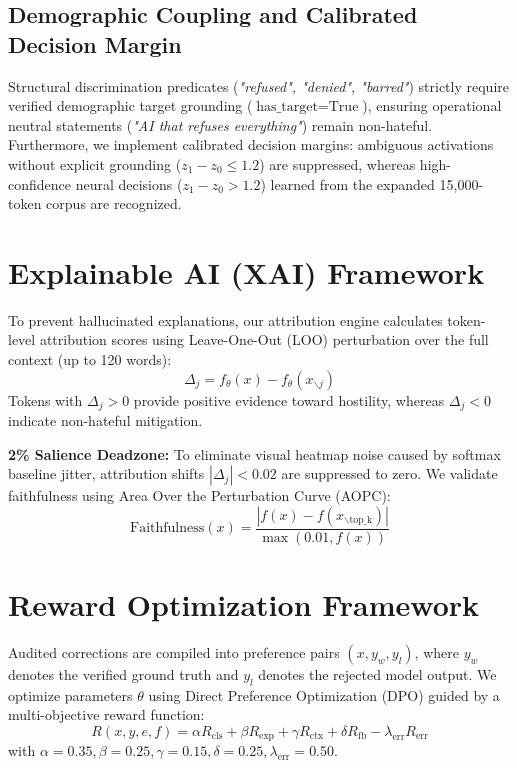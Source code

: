 \documentclass[11pt]{article}
\begin{document}
\subsection{Demographic Coupling and Calibrated Decision Margin}
Structural discrimination predicates (\textit{"refused", "denied", "barred"}) strictly require verified demographic target grounding ($\text{has\_target} = \text{True}$), ensuring operational neutral statements (\textit{"AI that refuses everything"}) remain non-hateful. Furthermore, we implement calibrated decision margins: ambiguous activations without explicit grounding ($z_1 - z_0 \le 1.2$) are suppressed, whereas high-confidence neural decisions ($z_1 - z_0 > 1.2$) learned from the expanded 15,000-token corpus are recognized.

\section{Explainable AI (XAI) Framework}
To prevent hallucinated explanations, our attribution engine calculates token-level attribution scores using Leave-One-Out (LOO) perturbation over the full context (up to 120 words):
\begin{equation}
    \Delta_j = f_\theta(x) - f_\theta(x_{\backslash j})
\end{equation}
Tokens with $\Delta_j > 0$ provide positive evidence toward hostility, whereas $\Delta_j < 0$ indicate non-hateful mitigation. 

\textbf{2\% Salience Deadzone:} To eliminate visual heatmap noise caused by softmax baseline jitter, attribution shifts $|\Delta_j| < 0.02$ are suppressed to zero. We validate faithfulness using Area Over the Perturbation Curve (AOPC):
\begin{equation}
    \text{Faithfulness}(x) = \frac{|f(x) - f(x_{\backslash \text{top\_k}})|}{\max(0.01, f(x))}
\end{equation}

\section{Reward Optimization Framework}
Audited corrections are compiled into preference pairs $(x, y_w, y_l)$, where $y_w$ denotes the verified ground truth and $y_l$ denotes the rejected model output. We optimize parameters $\theta$ using Direct Preference Optimization (DPO) guided by a multi-objective reward function:
\begin{equation}
    R(x, y, e, f) = \alpha R_{\text{cls}} + \beta R_{\text{exp}} + \gamma R_{\text{ctx}} + \delta R_{\text{fb}} - \lambda_{\text{err}} R_{\text{err}}
\end{equation}
with $\alpha=0.35, \beta=0.25, \gamma=0.15, \delta=0.25, \lambda_{\text{err}}=0.50$.
\end{document}
